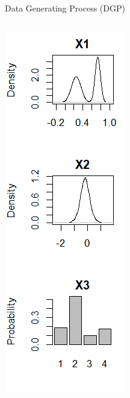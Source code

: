 \documentclass[onlytextwidth,english]{beamer}\usepackage[]{graphicx}\usepackage[]{xcolor}
\begin{document}
\begin{frame}{Data Generating Process (DGP)}
\begin{columns}
\begin{column}{0.28\textwidth}
\includegraphics[width=0.8\linewidth]{img/DGP_Variables.png}
\end{column}

\end{columns}

\end{frame}
\end{document}
